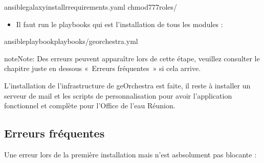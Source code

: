 \documentclass[letterpaper,10pt,french]{sphinxmanual}
\begin{document}
\begin{sphinxVerbatim}[commandchars=\\\{\}]
ansible\PYGZhy{}galaxyinstall\PYGZhy{}rrequirements.yaml
chmod\PYGZhy{}777roles/
\end{sphinxVerbatim}
\begin{itemize}
\item {} 
\sphinxAtStartPar
Il faut run le playbooks qui est l’installation de tous les modules :

\end{itemize}

\begin{sphinxVerbatim}[commandchars=\\\{\}]
ansible\PYGZhy{}playbookplaybooks/georchestra.yml
\end{sphinxVerbatim}

\begin{sphinxadmonition}{note}{Note:}
\sphinxAtStartPar
Des erreurs peuvent apparaître lors de cette étape, veuillez consulter le chapitre juste en dessous « Erreurs fréquentes » si cela arrive.
\end{sphinxadmonition}

\sphinxAtStartPar
L’installation de l’infrastructure de geOrchestra est faite, il reste à installer un serveur de mail et les scripts de personnalisation pour avoir
l’application fonctionnel et complète pour l’Office de l’eau Réunion.


\subsection{Erreurs fréquentes}
\label{\detokenize{doc_instal/installation:erreurs-frequentes}}
\sphinxAtStartPar
Une erreur lors de la première installation mais n’est asbsolument pas blocante :
\end{document}
